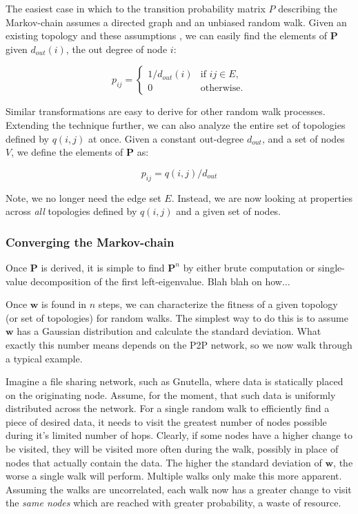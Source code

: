 \documentclass[a4paper,11pt,twocolumn]{article}
\begin{document}
The easiest case in which to the transition probability matrix $P$ describing
the Markov-chain assumes a directed graph and an unbiased random walk.
Given an existing topology and these assumptions , we can easily find the
elements of $\textbf{P}$ given $d_{out}(i)$, the out degree of node $i$:

\begin{equation}
	p_{ij} = \begin{cases}
							1 / d_{out}(i) & \text{if $ij \in E$,}\\
							0              & \text{otherwise.}
					 \end{cases}
\end{equation}

Similar transformations are easy to derive for other random walk processes.
Extending the technique further, we can also analyze the entire set of
topologies defined by $q(i,j)$ at once.  Given a constant out-degree $d_{out}$,
and a set of nodes $V$, we define the elements of $\textbf{P}$ as:

\begin{equation}
	p_{ij} = q(i,j) / d_{out}
\end{equation}

Note, we no longer need the edge set $E$.  Instead, we are now looking at
properties across \emph{all} topologies defined by $q(i,j)$ and a given set of
nodes.

\subsubsection{Converging the Markov-chain}

Once $\textbf{P}$ is derived, it is simple to find $\textbf{P}^n$ by either
brute computation or single-value decomposition of the first left-eigenvalue.
Blah blah on how$\ldots$

Once $\textbf{w}$ is found in $n$ steps, we can characterize the fitness of a
given topology (or set of topologies) for random walks.  The simplest way to do
this is to assume $\textbf{w}$ has a Gaussian distribution and
calculate the standard deviation.  What exactly this number means depends on
the P2P network, so we now walk through a typical example.

Imagine a file sharing network, such as Gnutella, where data is statically
placed on the originating node.  Assume, for the moment, that such data is
uniformly distributed across the network.  For a single random walk to
efficiently find a piece of desired data, it needs to visit the greatest number
of nodes possible during it's limited number of hops.  Clearly, if some nodes
have a higher change to be visited, they will be visited more often during the
walk, possibly in place of nodes that actually contain the data.  The higher
the standard deviation of $\textbf{w}$, the worse a single walk will perform.
Multiple walks only make this more apparent.  Assuming the walks are
uncorrelated, each walk now has a greater change to visit the \emph{same nodes}
which are reached with greater probability, a waste of resource.
\end{document}
